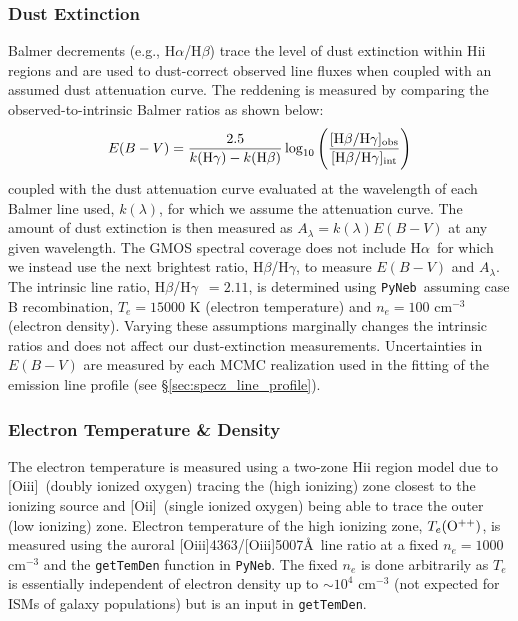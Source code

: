 \documentclass[twocolumn,tight,times,linenumbers]{aastex631}
\newcommand{\halpha}{H$\alpha$}
\newcommand{\hbeta}{H$\beta$}
\newcommand{\hgamma}{H$\gamma$}
\newcommand{\oii}{[O{\sc ii}]}
\newcommand{\oiii}{[O{\sc iii}]}
\newcommand{\pyneb}{\texttt{PyNeb}}
\begin{document}
				
		\subsubsection{Dust Extinction}
		
		Balmer decrements (e.g., \halpha/\hbeta) trace the level of dust extinction within H{\sc ii} regions and are used to dust-correct observed line fluxes when coupled with an assumed dust attenuation curve. The reddening is measured by comparing the observed-to-intrinsic Balmer ratios as shown below:
		\begin{eqnarray}
			E(B-V) = \frac{2.5}{k(\textrm{\hgamma}) - k(\textrm{\hbeta})} \log_{10} \Bigg(\frac{ [\textrm{\hbeta}/\textrm{\hgamma}]_\textrm{\scriptsize obs} }{[\textrm{\hbeta}/\textrm{\hgamma}]_\textrm{\scriptsize int}}\Bigg)
		\end{eqnarray}
		coupled with the dust attenuation curve evaluated at the wavelength of each Balmer line used, $k(\lambda)$, for which we assume the \citet{Calzetti2000} attenuation curve. The amount of dust extinction is then measured as $A_\lambda = k(\lambda) E(B-V)$ at any given wavelength. The GMOS spectral coverage does not include \halpha~for which we instead use the next brightest ratio, \hbeta/\hgamma, to measure $E(B-V)$ and $A_\lambda$. The intrinsic line ratio, \hbeta/\hgamma~$ = 2.11$, is determined using \pyneb~assuming case B recombination, $T_e = 15000$ K (electron temperature) and $n_e = 100$ cm$^{-3}$ (electron density). Varying these assumptions marginally changes the intrinsic ratios and does not affect our dust-extinction measurements. Uncertainties in $E(B-V)$ are measured by each MCMC realization used in the fitting of the emission line profile (see \S\ref{sec:specz_line_profile}).
		
		\subsubsection{Electron Temperature \& Density}
		\label{sec:ne_and_te}
		The electron temperature is measured using a two-zone H{\sc ii} region model due to \oiii~(doubly ionized oxygen) tracing the (high ionizing) zone closest to the ionizing source and \oii~(single ionized oxygen) being able to trace the outer (low ionizing) zone. Electron temperature of the high ionizing zone, $T_e(\rm{O}^{++})$, is measured using the auroral \oiii4363/\oiii5007\AA~line ratio at a fixed $n_e = 1000$ cm$^{-3}$ and the \texttt{getTemDen} function in \pyneb. The fixed $n_e$ is done arbitrarily as $T_e$ is essentially independent of electron density up to $\sim 10^4$ cm$^{-3}$ (not expected for ISMs of galaxy populations) but is an input in \texttt{getTemDen}.%
		
\end{document}
